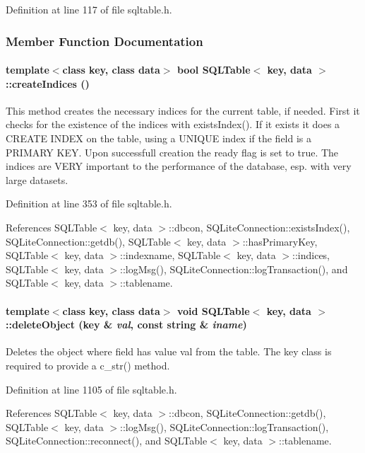 Definition at line 117 of file sqltable.h.

\subsubsection{Member Function Documentation}
\hypertarget{classSQLTable_SQLTablea5}{
\paragraph[createIndices]{\setlength{\rightskip}{0pt plus 5cm}template$<$class key, class data$>$ bool SQLTable$<$ key, data $>$::create\-Indices ()}\hfill}
\label{classSQLTable_SQLTablea5}


This method creates the necessary indices for the current table, if needed. First it checks for the existence of the indices with exists\-Index(). If it exists it does a CREATE INDEX on the table, using a UNIQUE index if the field is a PRIMARY KEY. Upon successfull creation the ready flag is set to true. The indices are VERY important to the performance of the database, esp. with very large datasets. 

Definition at line 353 of file sqltable.h.

References SQLTable$<$ key, data $>$::dbcon, SQLite\-Connection::exists\-Index(), SQLite\-Connection::getdb(), SQLTable$<$ key, data $>$::has\-Primary\-Key, SQLTable$<$ key, data $>$::indexname, SQLTable$<$ key, data $>$::indices, SQLTable$<$ key, data $>$::log\-Msg(), SQLite\-Connection::log\-Transaction(), and SQLTable$<$ key, data $>$::tablename.\hypertarget{classSQLTable_SQLTablea22}{
\paragraph[deleteObject]{\setlength{\rightskip}{0pt plus 5cm}template$<$class key, class data$>$ void SQLTable$<$ key, data $>$::delete\-Object (key \& {\em val}, const string \& {\em iname})}\hfill}
\label{classSQLTable_SQLTablea22}


Deletes the object where field has value val from the table. The key class is required to provide a c\_\-str() method. 

Definition at line 1105 of file sqltable.h.

References SQLTable$<$ key, data $>$::dbcon, SQLite\-Connection::getdb(), SQLTable$<$ key, data $>$::log\-Msg(), SQLite\-Connection::log\-Transaction(), SQLite\-Connection::reconnect(), and SQLTable$<$ key, data $>$::tablename.

